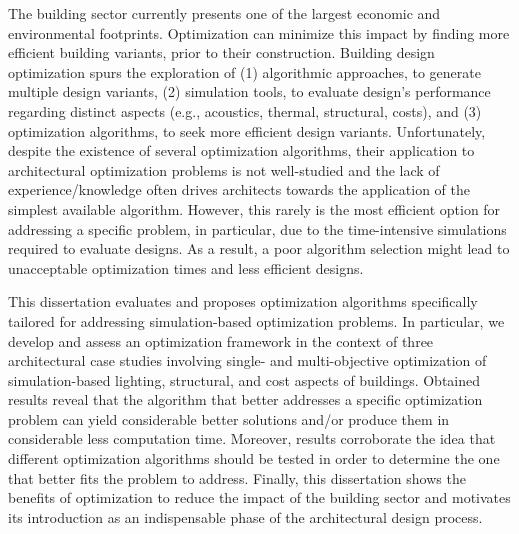 \noindent 

The building sector currently presents one of the largest economic and environmental footprints. Optimization can minimize this impact by finding more efficient building variants, prior to their construction. Building design optimization spurs the exploration of (1) algorithmic approaches, to generate multiple design variants, (2) simulation tools, to evaluate design's performance regarding distinct aspects (e.g., acoustics, thermal, structural, costs), and (3) optimization algorithms, to seek more efficient design variants. Unfortunately, despite the existence of several optimization algorithms, their application to architectural optimization problems is not well-studied and the lack of experience/knowledge often drives architects towards the application of the simplest available algorithm. However, this rarely is the most efficient option for addressing a specific problem, in particular, due to the time-intensive simulations required to evaluate designs. As a result, a poor algorithm selection might lead to unacceptable optimization times and less efficient designs. 

This dissertation evaluates and proposes optimization algorithms specifically tailored for addressing simulation-based optimization problems. In particular, we develop and assess an optimization framework in the context of three architectural case studies involving single- and multi-objective optimization of simulation-based lighting, structural, and cost aspects of buildings. Obtained results reveal that the algorithm that better addresses a specific optimization problem can yield considerable better solutions and/or produce them in considerable less computation time. Moreover, results corroborate the idea that different optimization algorithms should be tested in order to determine the one that better fits the problem to address. Finally, this dissertation shows the benefits of optimization to reduce the impact of the building sector and motivates its introduction as an indispensable phase of the architectural design process.
